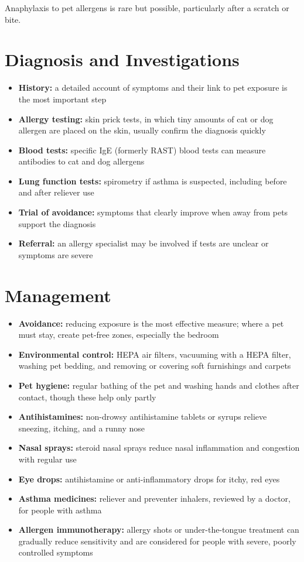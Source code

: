 Anaphylaxis to pet allergens is rare but possible, particularly after a scratch or bite.

\section*{Diagnosis and Investigations}
\begin{itemize}
    \item \textbf{History:} a detailed account of symptoms and their link to pet exposure is the most important step
    \item \textbf{Allergy testing:} skin prick tests, in which tiny amounts of cat or dog allergen are placed on the skin, usually confirm the diagnosis quickly
    \item \textbf{Blood tests:} specific IgE (formerly RAST) blood tests can measure antibodies to cat and dog allergens
    \item \textbf{Lung function tests:} spirometry if asthma is suspected, including before and after reliever use
    \item \textbf{Trial of avoidance:} symptoms that clearly improve when away from pets support the diagnosis
    \item \textbf{Referral:} an allergy specialist may be involved if tests are unclear or symptoms are severe
\end{itemize}

\section*{Management}
\begin{itemize}
    \item \textbf{Avoidance:} reducing exposure is the most effective measure; where a pet must stay, create pet-free zones, especially the bedroom
    \item \textbf{Environmental control:} HEPA air filters, vacuuming with a HEPA filter, washing pet bedding, and removing or covering soft furnishings and carpets
    \item \textbf{Pet hygiene:} regular bathing of the pet and washing hands and clothes after contact, though these help only partly
    \item \textbf{Antihistamines:} non-drowsy antihistamine tablets or syrups relieve sneezing, itching, and a runny nose
    \item \textbf{Nasal sprays:} steroid nasal sprays reduce nasal inflammation and congestion with regular use
    \item \textbf{Eye drops:} antihistamine or anti-inflammatory drops for itchy, red eyes
    \item \textbf{Asthma medicines:} reliever and preventer inhalers, reviewed by a doctor, for people with asthma
    \item \textbf{Allergen immunotherapy:} allergy shots or under-the-tongue treatment can gradually reduce sensitivity and are considered for people with severe, poorly controlled symptoms
\end{itemize}

